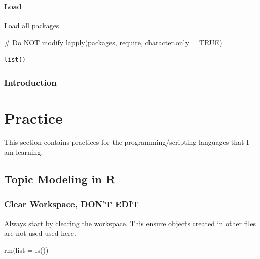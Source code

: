 \documentclass[
  letterpaper,
  DIV=11,
  numbers=noendperiod]{scrreprt}
\newenvironment{Shaded}{\begin{snugshade}}{\end{snugshade}}
\newcommand{\AttributeTok}[1]{\textcolor[rgb]{0.40,0.45,0.13}{#1}}
\newcommand{\CommentTok}[1]{\textcolor[rgb]{0.37,0.37,0.37}{#1}}
\newcommand{\ConstantTok}[1]{\textcolor[rgb]{0.56,0.35,0.01}{#1}}
\newcommand{\FunctionTok}[1]{\textcolor[rgb]{0.28,0.35,0.67}{#1}}
\newcommand{\NormalTok}[1]{\textcolor[rgb]{0.00,0.23,0.31}{#1}}
\begin{document}
\subsection*{Load}\label{load-8}

Load all packages

\begin{Shaded}
\begin{Highlighting}[]
\CommentTok{\# Do NOT modify}
\FunctionTok{lapply}\NormalTok{(packages, require, }\AttributeTok{character.only =} \ConstantTok{TRUE}\NormalTok{)}
\end{Highlighting}
\end{Shaded}

\begin{verbatim}
list()
\end{verbatim}

\section{Introduction}\label{introduction-6}

\part{Practice}

This section contains practices for the programming/scripting languages
that I am learning.

\chapter{Topic Modeling in R}\label{topic-modeling-in-r}

\section*{Clear Workspace, DON'T
EDIT}\label{clear-workspace-dont-edit-9}


Always start by clearing the workspace. This ensure objects created in
other files are not used used here.

\begin{Shaded}
\begin{Highlighting}[]
\FunctionTok{rm}\NormalTok{(}\AttributeTok{list =} \FunctionTok{ls}\NormalTok{())}
\end{Highlighting}
\end{Shaded}
\end{document}
